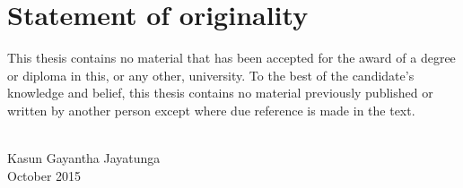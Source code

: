 \chapter*{Statement of originality}

This thesis contains no material that has been accepted for the award of a degree or diploma in this, or any other, university. To the best of the candidate’s knowledge and belief, this thesis contains no material previously published or written by another person except where due reference is made in the text.

\vspace{20mm}

\begin{flushright}
\solidrule\solidrule\solidrule\solidrule\solidrule\\
Kasun Gayantha Jayatunga\\
October 2015
\end{flushright}